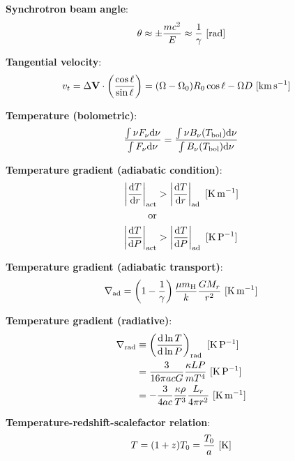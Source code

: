 \documentclass[a4paper,10pt]{article}
\begin{document}
{\noindent}\textbf{Synchrotron beam angle}:
\begin{align*}
    \theta \approx \pm \frac{mc^2}{E} \approx \frac{1}{\gamma} ~ [{\rm rad}]
\end{align*}

{\noindent}\textbf{Tangential velocity}:
\begin{align*}
    v_t &= \Delta\mathbf{V}\cdot\left(\frac{\cos\ell}{\sin\ell}\right) = (\Omega-\Omega_0)R_0\cos\ell - \Omega D ~ [{\rm km\,s^{-1}}]
\end{align*}

{\noindent}\textbf{Temperature (bolometric)}:
\begin{align*}
    \frac{\int\nu F_\nu {\rm d}\nu}{\int F_\nu {\rm d}\nu} = \frac{\int\nu B_\nu(T_{\rm bol}){\rm d}\nu}{\int B_\nu(T_{\rm bol}){\rm d}\nu}
\end{align*}

{\noindent}\textbf{Temperature gradient (adiabatic condition)}:
\begin{align*}
    \left\lvert\frac{{\rm d}T}{{\rm d}r}\right\rvert_{\rm act} &> \left\lvert\frac{{\rm d}T}{{\rm d}r}\right\rvert_{\rm ad} ~ [{\rm K\,m^{-1}}] \\
    {\rm or} \\
    \left\lvert\frac{{\rm d}T}{{\rm d}P}\right\rvert_{\rm act} &> \left\lvert\frac{{\rm d}T}{{\rm d}P}\right\rvert_{\rm ad} ~ [{\rm K\,P^{-1}}]
\end{align*}

{\noindent}\textbf{Temperature gradient (adiabatic transport)}:
\begin{align*}
    \nabla_{\rm ad} = \left(1-\frac{1}{\gamma}\right) \frac{\mu m_{\rm H}}{k}\frac{GM_r}{r^2} ~ [{\rm K\,m^{-1}}]
\end{align*}

{\noindent}\textbf{Temperature gradient (radiative)}:
\begin{align*}
    \nabla_{\rm rad} &\equiv \left(\frac{{\rm d}\ln T}{{\rm d}\ln P}\right)_{\rm rad} ~ [{\rm K\,P^{-1}}] \\
    &= \frac{3}{16\pi acG}\frac{\kappa LP}{mT^4} ~ [{\rm K\,P^{-1}}] \\
    &= -\frac{3}{4ac}\frac{\kappa\rho}{T^3}\frac{L_r}{4\pi r^2} ~ [{\rm K\,m^{-1}}]
\end{align*}

{\noindent}\textbf{Temperature-redshift-scalefactor relation}:
\begin{align*}
    T = (1+z)T_0 = \frac{T_0}{a} ~ [{\rm K}]
\end{align*}
\end{document}
